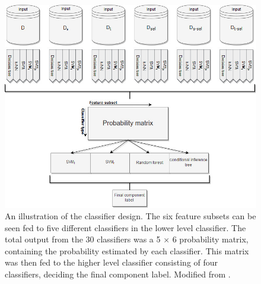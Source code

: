 \begin{figure}[H]                 
	\includegraphics[width=.95\textwidth]{figures/bMethods/classifier}  
	\caption{An illustration of the classifier design. The six feature subsets can be seen fed to five different classifiers in the lower level classifier. The total output from the 30 classifiers was a 5 $\times$ 6 probability matrix, containing the probability estimated by each classifier. This matrix was then fed to the higher level classifier consisting of four classifiers, deciding the final component label. Modified from \cite{Salimi-Khorshidi2014}.}
	\label{fig:classifier} 
\end{figure}


